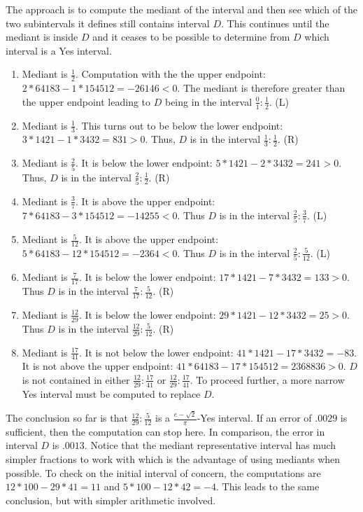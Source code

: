 \documentclass[12pt]{article}
\theoremstyle{remark}
\begin{document}
The approach is to compute the mediant of the interval and then see which of the two subintervals it defines still contains interval $D$. This continues until the mediant is inside $D$ and it ceases to be possible to determine from $D$ which interval is a Yes interval. 
\begin{enumerate}
\item Mediant is $\frac{1}{2}$. Computation with the the upper endpoint:  $2*64183 - 1*154512 = -26146 < 0$. The mediant is therefore greater than the upper endpoint leading to $D$ being in the interval $\frac{0}{1}: \frac{1}{2}$. (L)
\item Mediant is $\frac{1}{3}$. This turns out to be below the lower endpoint:  $3*1421 - 1*3432 = 831>0$. Thus, $D$ is in the interval $\frac{1}{3}: \frac{1}{2}$. (R)
\item Mediant is $\frac{2}{5}$. It is below the lower endpoint: $5*1421 - 2*3432 = 241 > 0$. Thus, $D$ is in the interval $\frac{2}{5}: \frac{1}{2}$. (R)
\item Mediant is $\frac{3}{7}$. It is above the upper endpoint: $7*64183- 3*154512 = -14255 < 0$. Thus $D$ is in the interval $\frac{2}{5}: \frac{3}{7}$. (L)
\item Mediant is $\frac{5}{12}$. It is above the upper endpoint: $5*64183 - 12*154512 = -2364 < 0$. Thus $D$ is in the interval $\frac{2}{5}: \frac{5}{12}$. (L)
\item Mediant is $\frac{7}{17}$. It is below the lower endpoint: $17*1421 - 7*3432 = 133 > 0$. Thus $D$ is in the interval $\frac{7}{17}: \frac{5}{12}$. (R)
\item Mediant is $\frac{12}{29}$. It is below the lower endpoint: $29*1421 - 12*3432 = 25 > 0$. Thus $D$ is in the interval $\frac{12}{29}: \frac{5}{12}$. (R)
\item Mediant is $\frac{17}{41}$. It is not below the lower endpoint: $41*1421-17*3432 = -83$. It is not above the upper endpoint: $41*64183-17*154512 = 2368836 >0$. $D$ is not contained in either $\frac{12}{29}: \frac{17}{41}$ or $\frac{12}{29}:\frac{17}{41}$. To proceed further, a more narrow Yes interval must be computed to replace $D$. 
\end{enumerate}
The conclusion so far is that $\frac{12}{29}: \frac{5}{12}$ is a $\frac{e-\sqrt{2}}{\pi}$-Yes interval. If an error of $.0029$ is sufficient, then the computation can stop here. In comparison, the error in interval $D$ is $.0013$. Notice that the mediant representative interval has much simpler fractions to work with which is the advantage of using mediants when possible. To check on the initial interval of concern, the computations are $12*100 - 29*41 = 11$ and $5*100-12*42 = -4$. This leads to the same conclusion, but with simpler arithmetic involved. 
\end{document}
